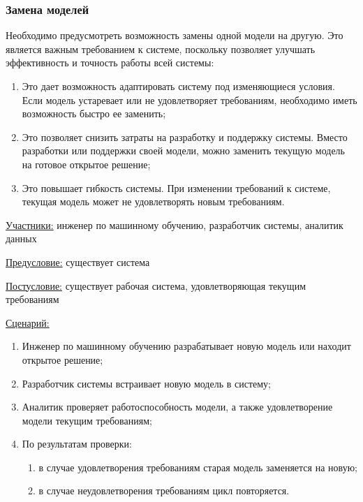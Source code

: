 \subsubsection{Замена моделей}

Необходимо предусмотреть возможность замены одной модели на другую. Это является важным требованием к системе, поскольку позволяет улучшать эффективность и точность работы всей системы:
\begin{enumerate}
    \item Это дает возможность адаптировать систему под изменяющиеся условия. Если модель устаревает или не удовлетворяет требованиям, необходимо иметь возможность быстро ее заменить;
    \item Это позволяет снизить затраты на разработку и поддержку системы. Вместо разработки или поддержки своей модели, можно заменить текущую модель на готовое открытое решение;
    \item Это повышает гибкость системы. При изменении требований к системе, текущая модель может не удовлетворять новым требованиям.
\end{enumerate}

\underline{Участники:} инженер по машинному обучению, разработчик системы, аналитик данных

\underline{Предусловие:} существует система

\underline{Постусловие:} существует рабочая система, удовлетворяющая текущим требованиям

\underline{Сценарий:}

\begin{enumerate}
    \item Инженер по машинному обучению разрабатывает новую модель или находит открытое решение;
    \item Разработчик системы встраивает новую модель в систему;
    \item Аналитик проверяет работоспособность модели, а также удовлетворение модели текущим требованиям;
    \item По результатам проверки:
        \begin{enumerate}
            \item в случае удовлетворения требованиям старая модель заменяется на новую;
            \item в случае неудовлетворения требованиям цикл повторяется.
        \end{enumerate}
\end{enumerate}